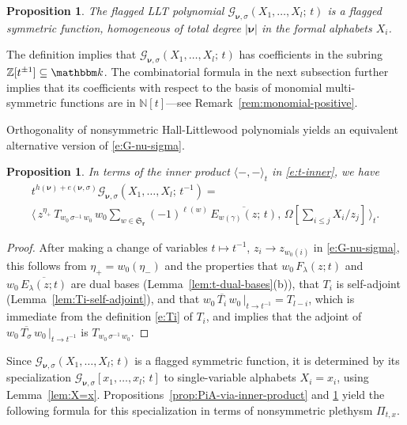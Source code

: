 \documentclass[12pt]{amsart}
\newtheorem{prop}[thm]{Proposition}
\theoremstyle{definition}
\theoremstyle{remark}
\newcommand{\NN}{{\mathbb N}}
\newcommand{\ZZ}{{\mathbb Z}}
\newcommand{\kk}{{\mathbbm k}}
\newcommand{\rr}{{\mathbf r}}
\newcommand{\nubold}{{\boldsymbol \nu }}
\newcommand{\Sfrak}{{\mathfrak S}}
\newcommand{\Gcal}{{\mathcal G}}
\begin{document}
\begin{prop}\label{prop:G-nu-flagged}
The flagged LLT polynomial $\Gcal _{\nubold ,\sigma
}(X_{1},\ldots,X_{l};\, t)$ is a flagged symmetric function,
homogeneous of total degree $|\nubold |$ in the formal alphabets $X_{i}$.
\end{prop}

The definition implies that $\Gcal _{\nubold ,\sigma
}(X_{1},\ldots,X_{l};\, t)$ has coefficients in the subring $\ZZ
[t^{\pm 1}]\subseteq \kk $.  The combinatorial formula in the next
subsection further implies that its coefficients with respect to the
basis of monomial multi-symmetric functions are in $\NN [t]$---see
Remark~\ref{rem:monomial-positive}.

Orthogonality of nonsymmetric Hall-Littlewood polynomials yields an
equivalent alternative version of \eqref{e:G-nu-sigma}.

\begin{prop}\label{prop:G-nu-sigma-bis}
In terms of the inner product $\langle -,- \rangle _{t}$ in
\eqref{e:t-inner}, we have
\begin{multline}\label{e:G-nu-sigma-bis}
t^{h(\nubold ) + e (\nubold ,\sigma )} \Gcal _{\nubold ,
\sigma}(X_{1},\ldots,X_{l};\, t^{-1}) = \\
\bigl\langle\, z^{\eta _{+}}\, T_{w_{0}\, \sigma ^{-1} \, w_{0}}\,
w_{0} \sum _{w\in \Sfrak _{\rr }} (-1)^{\ell (w)} \,
\overline{E_{w(\gamma )}(z;\, t)}, \, \Omega [\sum _{i\leq j} X_{i}
/z_{j}]\, \bigr\rangle _{t}.
\end{multline}
\end{prop}

\begin{proof}
After making a change of variables $t\mapsto t^{-1}$,
$z_{i}\rightarrow z_{w_{0}(i)}$ in \eqref{e:G-nu-sigma}, this follows
from $\eta _{+} = w_{0}(\eta _{-})$ and the properties that $w_{0}\,
F_{\lambda }(z; t)$ and $w_{0}\, \overline{E_{\lambda }(z; t)}$ are
dual bases (Lemma~\ref{lem:t-dual-bases}(b)), that $T_{i}$ is
self-adjoint (Lemma~\ref{lem:Ti-self-adjoint}), and that $w_{0}\,
\overline{T_{i}}\, w_{0}\, |_{t\rightarrow t^{-1}} = T_{l-i}$,
which is immediate from the definition \eqref{e:Ti} of $T_{i}$, and
implies that the adjoint of $w_{0}\, \overline{T_{\sigma }}\, w_{0}\,
|_{t\rightarrow t^{-1}}$ is $T_{w_{0}\, \sigma ^{-1} \, w_{0}}$.
\end{proof}


Since $\Gcal _{\nubold ,\sigma}(X_{1},\ldots,X_{l};\, t)$ is a flagged
symmetric function, it is determined by its specialization $\Gcal
_{\nubold ,\sigma}[x_{1},\ldots,x_{l};\, t]$ to single-variable
alphabets $X_{i} = x_{i}$, using Lemma~\ref{lem:X=x}.
Propositions~\ref{prop:PiA-via-inner-product} and
\ref{prop:G-nu-sigma-bis} yield the following formula for this
specialization in terms of nonsymmetric plethysm $\Pi _{t,x}$.
\end{document}
